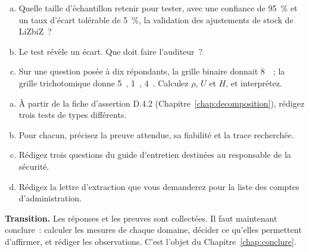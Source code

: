 \begin{boxexo}[title={\ding{45}\quad Exercice~8.2. Dimensionner et mesurer \niveaumoyen}]
\begin{enumerate}[(a)]
    \item Quelle taille d'échantillon retenir pour tester, avec une confiance
          de 95~\% et un taux d'écart tolérable de 5~\%, la validation des
          ajustements de stock de LiZbiZ~?
    \item Le test révèle un écart. Que doit faire l'auditeur~?
    \item Sur une question posée à dix répondants, la grille binaire donnait
          8~\OUI{}~; la grille trichotomique donne 5~\OUI{}, 1~\NON{},
          4~\NEK{}. Calculez $\rho$, $U$ et $H$, et interprétez.
\end{enumerate}
\end{boxexo}

\begin{boxexo}[title={\ding{45}\quad Exercice~8.3. Le plan de tests du sous-domaine D.4 \niveauexpert}]
\begin{enumerate}[(a)]
    \item À partir de la fiche d'assertion D.4.2 (Chapitre~\ref{chap:decomposition}),
          rédigez trois tests de types différents.
    \item Pour chacun, précisez la preuve attendue, sa fiabilité et la trace
          recherchée.
    \item Rédigez trois questions du guide d'entretien destinées au
          responsable de la sécurité.
    \item Rédigez la lettre d'extraction que vous demanderez pour la liste
          des comptes d'administration.
\end{enumerate}
\end{boxexo}

\bigskip

\begin{boxinfo}
\textbf{Transition.} Les réponses et les preuves sont collectées. Il faut
maintenant conclure~: calculer les mesures de chaque domaine, décider ce
qu'elles permettent d'affirmer, et rédiger les observations. C'est l'objet du
Chapitre~\ref{chap:conclure}.
\end{boxinfo}
